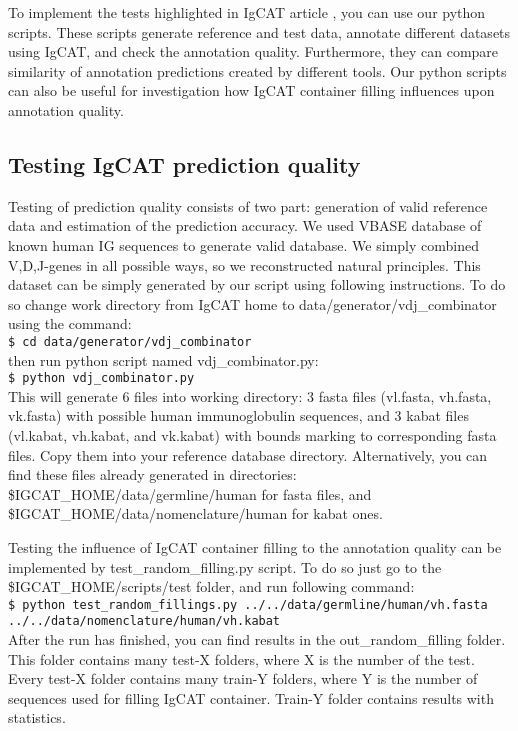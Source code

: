 \documentclass{scrartcl}
\newcommand{\shellcmd}[1]{\\\indent\indent\texttt{\footnotesize #1}\\}
\begin{document}
{{To implement the tests highlighted in IgCAT article \cite{Yakovlev2014},
you can use our python scripts.
These scripts generate reference and test data, annotate different datasets using IgCAT,
and check the annotation quality.
Furthermore, they can compare similarity of annotation predictions
created by different tools.
Our python scripts can also be useful for investigation
how IgCAT container filling influences upon annotation quality.

\subsection{Testing IgCAT prediction quality}

Testing of prediction quality consists of two part: generation of valid reference data and 
estimation of the prediction accuracy.
We used VBASE\cite{Tomlinson1996} database of known human IG sequences
to generate valid database. We simply combined V,D,J-genes in all possible ways,
so we reconstructed natural principles.
This dataset can be simply generated by our script using following instructions.
To do so change work directory from IgCAT home to data/generator/vdj\_combinator
using the command:
\shellcmd{\$ cd data/generator/vdj\_combinator}
then run python script named vdj\_combinator.py:
\shellcmd{\$ python vdj\_combinator.py}
This will generate 6 files into working directory:
3 fasta files (vl.fasta, vh.fasta, vk.fasta)
with possible human immunoglobulin sequences,
and 3 kabat files (vl.kabat, vh.kabat, and vk.kabat)
with bounds marking to corresponding fasta files.
Copy them into your reference database directory.
Alternatively, you can find these files already generated in directories:
\$IGCAT\_HOME/data/germline/human for fasta files,
and \$IGCAT\_HOME/data/nomenclature/human for kabat ones.


Testing the influence of IgCAT container filling 
to the annotation quality can be implemented by
test\_random\_filling.py script. To do so just go to the \$IGCAT\_HOME/scripts/test
folder, and run following command:
\shellcmd{\$ python test\_random\_fillings.py ../../data/germline/human/vh.fasta \\
../../data/nomenclature/human/vh.kabat}
After the run has finished, you can find results in the out\_random\_filling folder.
This folder contains many test-X folders, where X is the number of the test.
Every test-X folder contains many train-Y folders,
where Y is the number of sequences used for filling IgCAT
container. Train-Y folder contains results with statistics.

}}
\end{document}
